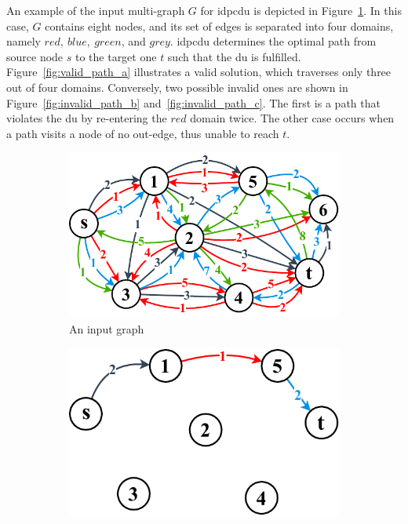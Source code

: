 An example of the input multi-graph $G$ for \gls{idpcdu} is depicted in Figure~\ref{fig:input_graph}. In this case, $G$ contains eight nodes, and its set of edges is separated into four domains, namely $red,~blue,~green$, and $grey$. \gls{idpcdu} determines the optimal path from source node $s$ to the target one $t$ such that the \gls{du} is fulfilled. Figure~\ref{fig:valid_path_a} illustrates a valid solution, which traverses only three out of four domains. Conversely, two possible invalid ones are shown in Figure~\ref{fig:invalid_path_b} and~\ref{fig:invalid_path_c}. The first is a path that violates the \gls{du} by re-entering the $red$ domain twice. The other case occurs when a path visits a node of no out-edge, thus unable to reach $t$.
\setlength{\intextsep}{3pt}
\renewcommand{\scalefigure}{0.7}
\begin{figure}[htbp]
	\centering
	\begin{subfigure}{.49\linewidth}
		\centering
		\includegraphics[scale=\scalefigure]{Figures/chap 2/Bold Input Graph.pdf}
		\caption{An input graph}
		\label{fig:input_graph}
	\end{subfigure}
	\begin{subfigure}{.49\linewidth}
		\centering
		\includegraphics[scale=\scalefigure]{Figures/chap 2/Valid Solution.pdf}

\end{subfigure}
\end{figure}
